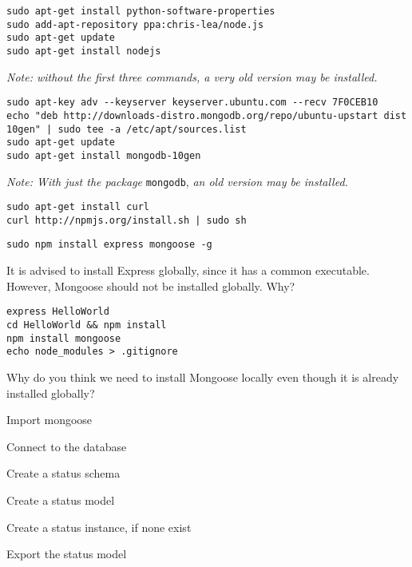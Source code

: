 \documentclass{article}
\begin{document}



\begin{verbatim}
sudo apt-get install python-software-properties
sudo add-apt-repository ppa:chris-lea/node.js
sudo apt-get update
sudo apt-get install nodejs
\end{verbatim}

\textit{Note: without the first three commands, a very old version may be installed.}


\begin{verbatim}
sudo apt-key adv --keyserver keyserver.ubuntu.com --recv 7F0CEB10
echo "deb http://downloads-distro.mongodb.org/repo/ubuntu-upstart dist 10gen" | sudo tee -a /etc/apt/sources.list
sudo apt-get update
sudo apt-get install mongodb-10gen
\end{verbatim}

\textit{Note: With just the package} \verb!mongodb!, \textit{an old version may be installed.}


\begin{verbatim}
sudo apt-get install curl
curl http://npmjs.org/install.sh | sudo sh
\end{verbatim}



\begin{verbatim}
sudo npm install express mongoose -g
\end{verbatim}

 It is advised to install Express globally, since it has a common executable. However, Mongoose should not be installed globally. Why?


\begin{verbatim}
express HelloWorld
cd HelloWorld && npm install
npm install mongoose
echo node_modules > .gitignore
\end{verbatim}

 Why do you think we need to install Mongoose locally even though it is already installed globally?


\begin{enumerate*}
\item Import mongoose
\item Connect to the database
\item Create a status schema
\item Create a status model
\item Create a status instance, if none exist
\item Export the status model
\end{enumerate*}
\end{document}
